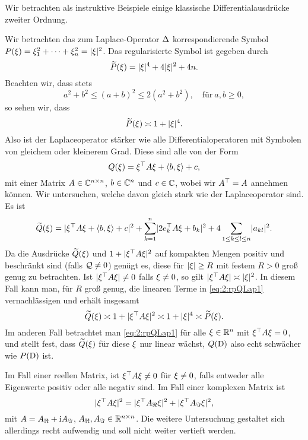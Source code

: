 Wir betrachten als instruktive Beispiele
einige klassische Differentialausdrücke zweiter Ordnung.

\begin{exa}\label{exa:2:lap}
Wir betrachten das zum Laplace-Operator $\Delta$
korrespondierende Symbol $P(\xi)=\xi_1^2+\dots+\xi_n^2=\lvert\xi\rvert^2$.
Das regularisierte Symbol ist gegeben durch
\begin{equation}
\widetilde{P}(\xi)=\lvert\xi\rvert^4+4\lvert\xi\rvert^2+4n.
\end{equation}
Beachten wir, dass stets
\begin{equation}\label{eq:2:sqrest}
a^2+b^2\leq(a+b)^2\leq2(a^2+b^2),\quad\text{für}~a,b\geq0,
\end{equation}
so sehen wir, dass
\begin{equation}
\widetilde{P}(\xi)\asymp1+\lvert\xi\rvert^4.
\end{equation}
Also ist der Laplaceoperator stärker wie alle Differentialoperatoren
mit Symbolen von gleichem oder kleinerem Grad.
Diese sind alle von der Form
\begin{equation}
Q(\xi)=\xi^\top A\xi+\langle b,\xi\rangle+c,
\end{equation}
mit einer Matrix $A\in\mathbb C^{n\times n}$, $b\in\mathbb C^n$ und $c\in\mathbb C$,
wobei wir $A^\top=A$ annehmen können.
Wir untersuchen, welche davon gleich stark wie der Laplaceoperator sind.
Es ist
\begin{equation}\label{eq:2:rpQLap1}
\widetilde{Q}(\xi)=\lvert\xi^\top A\xi+\langle b,\xi\rangle+c\rvert^2+\sum_{k=1}^n\lvert2e^\top_kA\xi+b_k\rvert^2
+4\sum_{1\leq k\leq l\leq n}\lvert a_{kl}\rvert^2.
\end{equation}
Da die Ausdrücke $\widetilde{Q}(\xi)$ und $1+\lvert\xi^\top A\xi\rvert^2$
auf kompakten Mengen positiv und beschränkt sind (falls $\mathcal Q\neq0$) genügt es,
diese für $\lvert\xi\rvert\geq R$ mit festem $R>0$ groß genug zu betrachten.
Ist $\lvert\xi^\top A\xi\rvert\neq0$ falls $\xi\neq0$,
so gilt $\lvert\xi^\top A\xi\rvert\asymp\lvert\xi\rvert^2$.
In diesem Fall kann man, für $R$ groß genug,
die linearen Terme in \eqref{eq:2:rpQLap1} vernachlässigen
und erhält insgesamt
\begin{equation}
\widetilde{Q}(\xi)\asymp1+\lvert\xi^\top A\xi\rvert^2\asymp1+\lvert\xi\rvert^4\asymp\widetilde{P}(\xi).
\end{equation}
Im anderen Fall betrachtet man \eqref{eq:2:rpQLap1}
für alle $\xi\in\mathbb R^n$ mit $\xi^\top A\xi=0$,
und stellt fest, dass $\widetilde{Q}(\xi)$ für diese $\xi$ nur linear wächst,
$Q(\mathrm D)$ also echt schwächer wie $P(\mathrm D)$ ist.

Im Fall einer reellen Matrix, ist $\xi^\top A\xi\neq0$ für $\xi\neq0$,
falls entweder alle Eigenwerte positiv oder alle negativ sind.
Im Fall einer komplexen Matrix ist
\begin{equation}
\lvert\xi^\top A\xi\rvert^2=\lvert\xi^\top A_\Re\xi\rvert^2+\lvert\xi^\top A_\Im\xi\rvert^2,
\end{equation}
mit $A=A_\Re+\mathrm i A_\Im$, $A_\Re,A_\Im\in\mathbb R^{n\times n}$.
Die weitere Untersuchung gestaltet sich allerdings recht aufwendig
und soll nicht weiter vertieft werden.
\end{exa}


